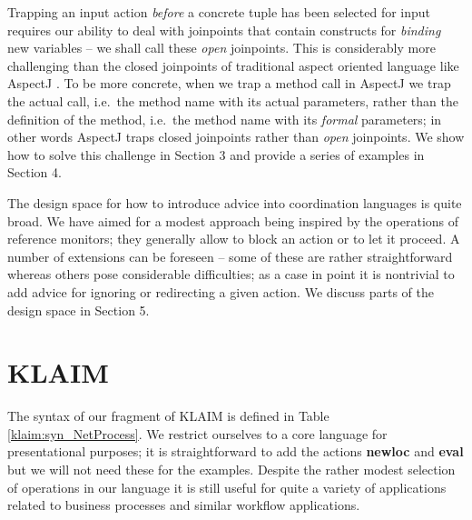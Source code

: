 \documentclass[a4paper]{llncs}
\begin{document}
Trapping an input action \emph{before} a concrete tuple has been
selected for input requires our ability to deal with joinpoints that
contain constructs for \emph{binding} new variables -- we shall call
these \emph{open} joinpoints. This is considerably more challenging
than the closed joinpoints of traditional aspect oriented language
like AspectJ \cite{kiczales2001oa}. To be more concrete, when we trap
a method call in AspectJ we trap the actual call, i.e.~the method name
with its actual parameters, rather than the definition of the method,
i.e.~the method name with its \emph{formal} parameters; in other words
AspectJ traps closed joinpoints rather than \emph{open} joinpoints. We show
how to solve this challenge in Section 3 and provide a series of examples in Section 4.

The design space for how to introduce advice into coordination
languages is quite broad. We have aimed for a modest approach being
inspired by the operations of reference monitors; they generally allow
to block an action or to let it proceed. A number of extensions can be
foreseen -- some of these are rather straightforward whereas others
pose considerable difficulties; as a case in point it is nontrivial to
add advice for ignoring or redirecting a given action. We discuss parts
of the design space in Section 5.



\section{KLAIM}\label{sec:klaim}

The syntax of our fragment of KLAIM is defined in Table
\ref{klaim:syn_NetProcess}.  We restrict ourselves to a core language
for presentational purposes; it is straightforward to add the actions
{\bf newloc} and {\bf eval} but we will not need these for the
examples.  Despite the rather modest selection of operations in our
language it is still useful for quite a variety of applications
related to business processes and similar workflow applications.
\end{document}
